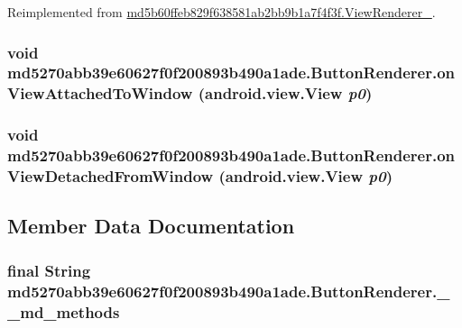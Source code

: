 Reimplemented from \hyperlink{classmd5b60ffeb829f638581ab2bb9b1a7f4f3f_1_1_view_renderer__2_0b758be41e41d3577cadf82bc8d004b6}{md5b60ffeb829f638581ab2bb9b1a7f4f3f.ViewRenderer\_}.\hypertarget{classmd5270abb39e60627f0f200893b490a1ade_1_1_button_renderer_096ced78b676353ccc21296f8eb579a3}{
\subsubsection[{onViewAttachedToWindow}]{\setlength{\rightskip}{0pt plus 5cm}void md5270abb39e60627f0f200893b490a1ade.ButtonRenderer.onViewAttachedToWindow (android.view.View {\em p0})}}
\label{classmd5270abb39e60627f0f200893b490a1ade_1_1_button_renderer_096ced78b676353ccc21296f8eb579a3}


\hypertarget{classmd5270abb39e60627f0f200893b490a1ade_1_1_button_renderer_197f3e7692578540f0931faffb7d50d0}{
\subsubsection[{onViewDetachedFromWindow}]{\setlength{\rightskip}{0pt plus 5cm}void md5270abb39e60627f0f200893b490a1ade.ButtonRenderer.onViewDetachedFromWindow (android.view.View {\em p0})}}
\label{classmd5270abb39e60627f0f200893b490a1ade_1_1_button_renderer_197f3e7692578540f0931faffb7d50d0}




\subsection{Member Data Documentation}
\hypertarget{classmd5270abb39e60627f0f200893b490a1ade_1_1_button_renderer_a6804b17a4e0acb62c327822a4dea5b2}{
\subsubsection[{\_\-\_\-md\_\-methods}]{\setlength{\rightskip}{0pt plus 5cm}final String {\bf md5270abb39e60627f0f200893b490a1ade.ButtonRenderer.\_\-\_\-md\_\-methods}}}
\label{classmd5270abb39e60627f0f200893b490a1ade_1_1_button_renderer_a6804b17a4e0acb62c327822a4dea5b2}




